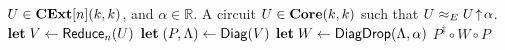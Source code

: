 \begin{algorithm}[t]
\caption{$\Drop_{n+1}(U, \alpha)$}\label{Alg:Drop}
\begin{algorithmic}
\Require $U \in \mathbf{CExt}[n]( k, k )$, and $\alpha \in \mathbb{R}$.
\Ensure A circuit $U \in \mathbf{Core}( k, k )$ such that $U \approx_E U \!\uparrow\! \alpha$.
    \State $\textbf{let} \; V \gets \mathsf{Reduce}_n( U )$
    \State $\textbf{let} \; ( P, \Lambda ) \gets \mathsf{Diag}( V )$
    \State $\textbf{let} \; W \gets \mathsf{DiagDrop}( \Lambda, \alpha )$
    \State \Return $P^\ddagger \circ W \circ P$
\end{algorithmic}
\end{algorithm}
